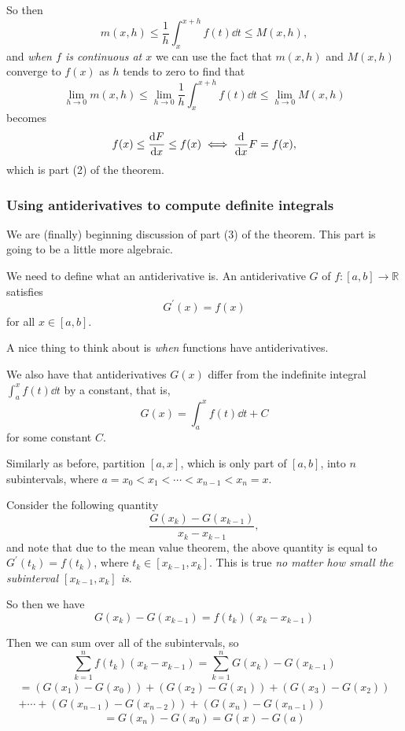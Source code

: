 \documentclass[mathserif]{beamer}
\newcommand{\br}[1]{\left(#1\right)}
\newcommand{\sbr}[1]{\left[#1\right]}
\begin{document}
\begin{frame}
  So then $$m(x,h)\leq \frac{1}{h}\int_x^{x+h}f(t)\dd{t}\leq M(x,h),$$ and \textit{when $f$ is continuous at $x$} we can use the fact that $m(x,h)$ and $M(x,h)$ converge to $f(x)$ as $h$ tends to zero to find that $$\lim_{h\to 0}m(x,h)\leq \lim_{h\to 0} \frac{1}{h}\int_x^{x+h}f(t)\dd{t} \leq \lim_{h\to 0}M(x,h)$$ becomes $$f(x) \leq \dv{F}{x} \leq f(x) \iff \dv{x}F = f(x) ,$$ which is part (2) of the theorem.
\end{frame}

\begin{frame}
  \frametitle{Using antiderivatives to compute definite integrals}
  We are (finally) beginning discussion of part (3) of the theorem. This part is going to be a little more algebraic.

  We need to define what an antiderivative is. An antiderivative $G$ of $f : \sbr{a,b}\to \mathbb{R}$ satisfies $$G^{\prime}(x) = f(x)$$ for all $x\in\sbr{a,b}$. 

  A nice thing to think about is \textit{when} functions have antiderivatives.
\end{frame}

\begin{frame}
  We also have that antiderivatives $G(x)$ differ from the indefinite integral $\int_a^x f(t)\dd{t}$ by a constant, that is, $$G(x) = \int_a^x f(t)\dd{t} + C$$ for some constant $C$.

  Similarly as before, partition $\sbr{a,x}$, which is only part of $\sbr{a,b}$, into $n$ subintervals, where $a = x_0 < x_1 < \cdots < x_{n-1} < x_n = x$.
\end{frame}

\begin{frame}
  Consider the following quantity $$\frac{G(x_k)-G(x_{k-1})}{x_k-x_{k-1}},$$ and note that due to the mean value theorem, the above quantity is equal to $G^{\prime}(t_k) = f(t_k)$, where $t_k\in\sbr{x_{k-1},x_k}$. This is true \textit{no matter how small the subinterval $\sbr{x_{k-1},x_k}$ is}.
  
  So then we have $$G(x_k)-G(x_{k-1}) = f(t_k)(x_k-x_{k-1})$$
\end{frame}

\begin{frame}
  Then we can sum over all of the subintervals, so $$\sum_{k=1}^n f(t_k)(x_k-x_{k-1}) = \sum_{k=1}^n G(x_k)-G(x_{k-1})$$ \begin{multline*}= \br{G(x_1)-G(x_0)} + \br{G(x_2)-G(x_1)} + \br{G(x_3)-G(x_2)} \\ + \cdots + \br{G(x_{n-1})-G(x_{n-2})} + \br{G(x_n)-G(x_{n-1})}\end{multline*}
  $$ = G(x_n)-G(x_0) = G(x) - G(a)$$
\end{frame}
\end{document}
